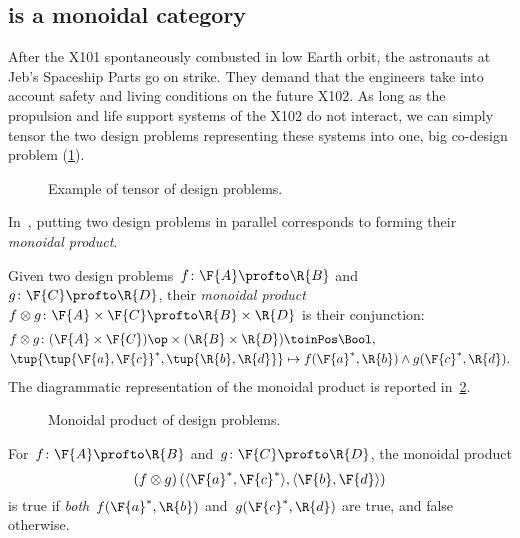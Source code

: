 \subsection{\DP is a monoidal category}
\begin{example}
After the X101 spontaneously combusted in low Earth orbit, the astronauts at Jeb's Spaceship Parts go on strike. They demand that the engineers take into account safety and living conditions on the future X102. As long as the propulsion and life support systems of the X102 do not interact, we can simply tensor the two design problems representing these systems into one, big co-design problem (\cref{fig:examplemonoidal}).
\begin{figure}[h!]
\begin{center}
\end{center}
\caption{Example of tensor of design problems. \label{fig:examplemonoidal}}
\end{figure}
\end{example}
In~\DP, putting two design problems in parallel corresponds to forming their \emph{monoidal product}.

\begin{definition}
\label{def:monoidalproduct}
Given two design problems~$f \colon \F{A} \profto \R{B}$ and~$g \colon \F{C} \profto \R{D}$, their \emph{monoidal product}~$f\otimes g \colon \F{A} \times \F{C} \profto \R{B} \times \R{D}$ is their conjunction:
\begin{equation}
\begin{aligned}
f \otimes g \colon (\F{A} \times \F{C})\op \times (\R{B} \times \R{D}) & \toinPos \Bool, \\
\tup{\tup{\F{a},\F{c}}^*,\tup{\R{b},\R{d}}} &\mapsto f(\F{a}^*,\R{b}) \wedge g(\F{c}^*,\R{d}).
\end{aligned}
\end{equation}
The diagrammatic representation of the monoidal product is reported in~\cref{fig:dpmonoidal}.
\end{definition}

\begin{figure}[h!]
\begin{center}
\end{center}
\caption{Monoidal product of design problems. \label{fig:dpmonoidal}}
\end{figure}


\begin{remark}
For~$f \colon \F{A} \profto \R{B}$ and~$g \colon \F{C} \profto \R{D}$, the monoidal product
\begin{equation}
    \left(f \otimes g\right)(\langle \F{a}^*, \F{c}^*\rangle, \langle \F{b},\F{d} \rangle)
\end{equation}
is true if \emph{both}~$f(\F{a}^*,\R{b})$ and~$g(\F{c}^*,\R{d})$ are true, and false otherwise.
\end{remark}

